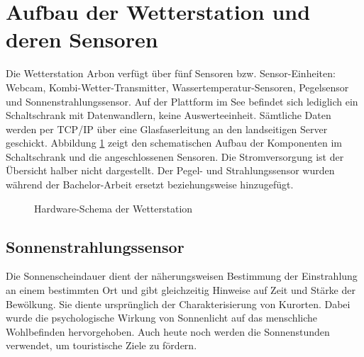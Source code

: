 \section{Aufbau der Wetterstation und deren Sensoren}
Die Wetterstation Arbon verfügt über fünf Sensoren bzw. Sensor-Einheiten: Webcam, Kombi-Wetter-Transmitter, Wassertemperatur-Sensoren, Pegelsensor und Sonnenstrahlungssensor. Auf der Plattform im See befindet sich lediglich ein Schaltschrank mit Datenwandlern, keine Auswerteeinheit. Sämtliche Daten werden per TCP/IP über eine Glasfaserleitung an den landseitigen Server geschickt. Abbildung \ref{img:schaltschrank} zeigt den schematischen Aufbau der Komponenten im Schaltschrank und die angeschlossenen Sensoren. Die Stromversorgung ist der Übersicht halber nicht dargestellt. Der Pegel- und Strahlungssensor wurden während der Bachelor-Arbeit ersetzt beziehungsweise hinzugefügt.

\begin{figure}[htbp]
	\centering
	\caption{Hardware-Schema der Wetterstation}
	\label{img:schaltschrank}
\end{figure}

\subsection{Sonnenstrahlungssensor}
Die Sonnenscheindauer dient der näherungsweisen Bestimmung der Einstrahlung an einem bestimmten Ort und gibt gleichzeitig Hinweise auf Zeit und Stärke der Bewölkung. Sie diente ursprünglich der Charakterisierung von Kurorten. Dabei wurde die psychologische Wirkung von Sonnenlicht auf das menschliche Wohlbefinden hervorgehoben. Auch heute noch werden die Sonnenstunden verwendet, um touristische Ziele zu fördern.

